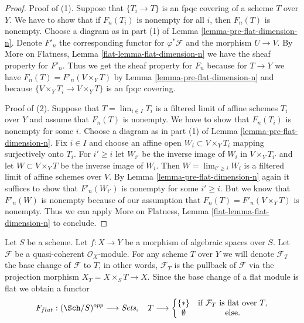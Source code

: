 \begin{proof}
Proof of (1). Suppose that $\{T_i \to T\}$ is an fpqc covering of
a scheme $T$ over $Y$. We have to show that if $F_n(T_i)$ is nonempty
for all $i$, then $F_n(T)$ is nonempty.
Choose a diagram as in part (1) of Lemma \ref{lemma-pre-flat-dimension-n}.
Denote $F'_n$ the corresponding functor for
$\varphi^*\mathcal{F}$ and the morphism $U \to V$.
By More on Flatness, Lemma \ref{flat-lemma-flat-dimension-n}
we have the sheaf property for $F'_n$.
Thus we get the sheaf property for $F_n$ because
for $T \to Y$ we have $F_n(T) = F'_n(V \times_Y T)$
by Lemma \ref{lemma-pre-flat-dimension-n}
and because $\{V \times_Y T_i \to V \times_Y T\}$
is an fpqc covering.

\medskip\noindent
Proof of (2). Suppose that $T = \lim_{i \in I} T_i$ is a filtered limit
of affine schemes $T_i$ over $Y$ and assume that $F_n(T)$ is nonempty.
We have to show that $F_n(T_i)$ is nonempty for some $i$.
Choose a diagram as in
part (1) of Lemma \ref{lemma-pre-flat-dimension-n}.
Fix $i \in I$ and choose an affine open $W_i \subset V \times_Y T_i$
mapping surjectively onto $T_i$. For $i' \geq i$ let $W_{i'}$
be the inverse image of $W_i$ in $V \times_Y T_{i'}$ and
let $W \subset V \times_Y T$ be the inverse image of $W_i$.
Then $W = \lim_{i' \geq i} W_i$ is a filtered limit of affine
schemes over $V$. By
Lemma \ref{lemma-pre-flat-dimension-n} again
it suffices to show that $F'_n(W_{i'})$ is nonempty for
some $i' \geq i$. But we know that $F'_n(W)$ is nonempty
because of our assumption that $F_n(T) = F'_n(V \times_Y T)$
is nonempty. Thus we can apply
More on Flatness, Lemma \ref{flat-lemma-flat-dimension-n}
to conclude.
\end{proof}

\begin{situation}
\label{situation-flat}
Let $S$ be a scheme.
Let $f : X \to Y$ be a morphism of algebraic spaces over $S$.
Let $\mathcal{F}$ be a quasi-coherent $\mathcal{O}_X$-module.
For any scheme $T$ over $Y$ we will denote $\mathcal{F}_T$ the
base change of $\mathcal{F}$ to $T$, in other words, $\mathcal{F}_T$
is the pullback of $\mathcal{F}$ via the projection morphism
$X_T = X \times_S T \to X$. Since the base change of a flat module
is flat we obtain a functor
\begin{equation}
\label{equation-flat}
F_{flat} : (\Sch/S)^{opp} \longrightarrow \textit{Sets}, \quad
T \longrightarrow \left\{
\begin{matrix}
\{*\} & \text{if } \mathcal{F}_T \text{ is flat over }T, \\
\emptyset & \text{else.}
\end{matrix}
\right.
\end{equation}
\end{situation}

